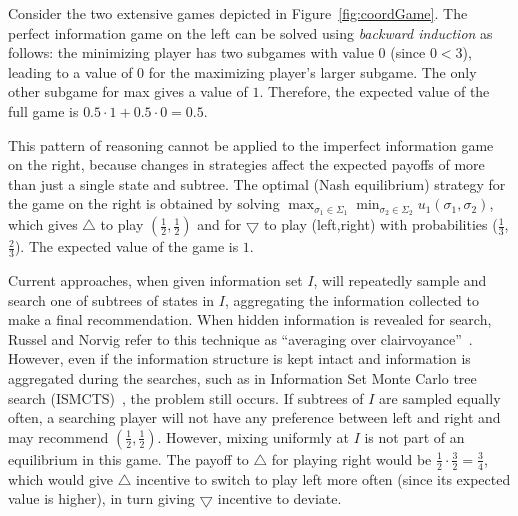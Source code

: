 \documentclass[letterpaper]{article}
\begin{document}

Consider the two extensive games depicted in Figure~\ref{fig:coordGame}. The perfect information game on the left can be solved using {\it backward induction}
as follows: the minimizing player has two subgames with value 0 (since $0 < 3$), leading to a value of 0 for the maximizing player's larger subgame. The only other subgame for max gives a value of $1$. Therefore, the expected value of the full game is $0.5 \cdot 1 + 0.5 \cdot 0 = 0.5$.

This pattern of reasoning cannot be applied to the imperfect information game on the right, because changes in strategies affect the expected payoffs of more 
than just a single state and subtree.
The optimal (Nash equilibrium) strategy for the game on the right is obtained by solving $\max_{\sigma_1 \in \Sigma_1} \min_{\sigma_2 \in \Sigma_2} u_1(\sigma_1, \sigma_2)$, which gives $\bigtriangleup$ to play $(\frac{1}{2},\frac{1}{2})$ and for $\bigtriangledown$ to play (left,right) with probabilities ($\frac{1}{3}$,$\frac{2}{3}$). The expected value of the game is $1$.

Current approaches, when given information set $I$, will repeatedly sample and search one of subtrees of states in $I$, aggregating the information collected to make a final recommendation. When hidden information is revealed for search, Russel and Norvig refer to this technique as ``averaging over clairvoyance''~\cite{russellnorvig}. However, even if the information structure is kept intact and information is aggregated during the searches, such as in Information Set Monte Carlo tree search (ISMCTS)~\cite{Cowling12ISMCTS}, the problem still occurs. If subtrees of $I$ are sampled equally often, a searching player will not have any preference between left and right and may recommend $(\frac{1}{2},\frac{1}{2})$. However, mixing uniformly at $I$ is not part of an equilibrium in this game. The payoff to $\bigtriangleup$ for playing right would be $\frac{1}{2} \cdot \frac{3}{2} = \frac{3}{4}$, which would give $\bigtriangleup$ incentive to switch to play left more often (since its expected value is higher), in turn giving $\bigtriangledown$ incentive to deviate. 
\end{document}

